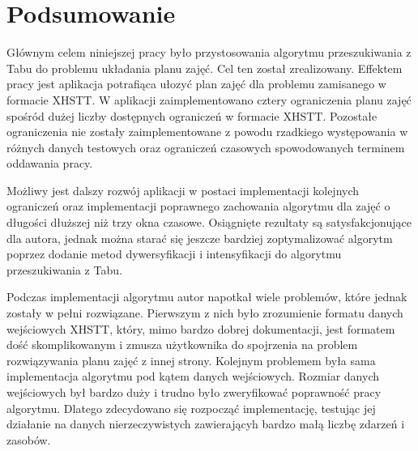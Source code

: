 \chapter{Podsumowanie}

Głównym celem niniejszej pracy było przystosowania algorytmu przeszukiwania z Tabu do problemu układania planu zajęć. Cel ten został zrealizowany. Effektem pracy jest aplikacja potrafiąca ułozyć plan zajęć dla problemu zamisanego w formacie XHSTT. W aplikacji zaimplementowano cztery ograniczenia planu zajęć spośród dużej liczby dostępnych ograniczeń w formacie XHSTT. Pozostałe ograniczenia nie zostały zaimplementowane z powodu rzadkiego występowania w różnych danych testowych oraz ograniczeń czasowych spowodowanych terminem oddawania pracy. 

Możliwy jest dalszy rozwój aplikacji w postaci implementacji kolejnych ograniczeń oraz implementacji poprawnego zachowania algorytmu dla zajęć o długości dłuższej niż trzy okna czasowe. Osiągnięte rezultaty są satysfakcjonujące dla autora, jednak można starać się jeszcze bardziej zoptymalizować algorytm poprzez dodanie metod dywersyfikacji i intensyfikacji do algorytmu przeszukiwania z Tabu.

Podczas implementacji algorytmu autor napotkał wiele problemów, które jednak zostały w pełni rozwiązane. Pierwszym z nich było zrozumienie formatu danych wejściowych XHSTT, który, mimo bardzo dobrej dokumentacji, jest formatem dość skomplikowanym i zmusza użytkownika do spojrzenia na problem rozwiązywania planu zajęć z innej strony. Kolejnym problemem była sama implementacja algorytmu pod kątem danych wejściowych. Rozmiar danych wejściowych był bardzo duży i trudno było zweryfikować poprawność pracy algorytmu. Dlatego zdecydowano się rozpocząć implementację, testując jej działanie na danych nierzeczywistych zawierającyh bardzo małą liczbę zdarzeń i zasobów.